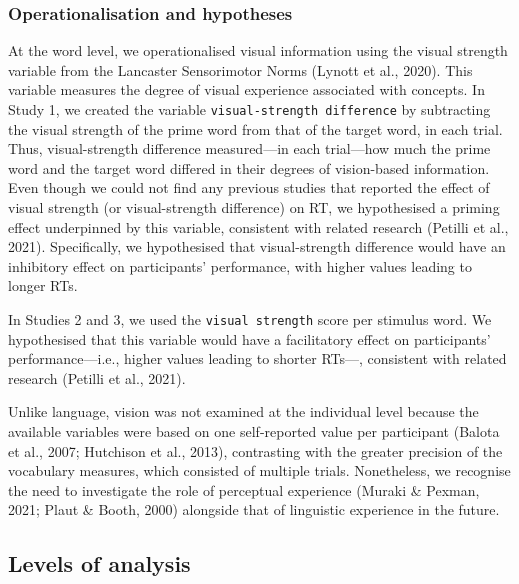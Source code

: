 \documentclass[
  12pt,
  man,floatsintext]{apa7}
\begin{document}
\hypertarget{operationalisation-and-hypotheses-1}{%
\subsubsection{Operationalisation and hypotheses}\label{operationalisation-and-hypotheses-1}}

At the word level, we operationalised visual information using the visual strength variable from the Lancaster Sensorimotor Norms (Lynott et al., 2020). This variable measures the degree of visual experience associated with concepts. In Study 1, we created the variable \texttt{visual-strength\ difference} by subtracting the visual strength of the prime word from that of the target word, in each trial. Thus, visual-strength difference measured---in each trial---how much the prime word and the target word differed in their degrees of vision-based information. Even though we could not find any previous studies that reported the effect of visual strength (or visual-strength difference) on RT, we hypothesised a priming effect underpinned by this variable, consistent with related research (Petilli et al., 2021). Specifically, we hypothesised that visual-strength difference would have an inhibitory effect on participants' performance, with higher values leading to longer RTs.

In Studies 2 and 3, we used the \texttt{visual\ strength} score per stimulus word. We hypothesised that this variable would have a facilitatory effect on participants' performance---i.e., higher values leading to shorter RTs---, consistent with related research (Petilli et al., 2021).

Unlike language, vision was not examined at the individual level because the available variables were based on one self-reported value per participant (Balota et al., 2007; Hutchison et al., 2013), contrasting with the greater precision of the vocabulary measures, which consisted of multiple trials. Nonetheless, we recognise the need to investigate the role of perceptual experience (Muraki \& Pexman, 2021; Plaut \& Booth, 2000) alongside that of linguistic experience in the future.

\hypertarget{levels-of-analysis}{%
\subsection{Levels of analysis}\label{levels-of-analysis}}
\end{document}
